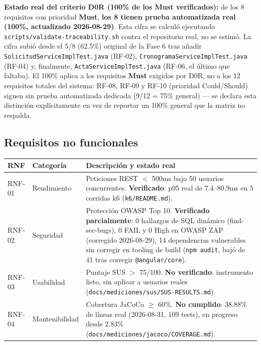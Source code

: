 \documentclass[11pt,a4paper]{article}
\begin{document}
\textbf{Estado real del criterio D0R (100\% de los Must verificados):} de los 8 requisitos con
prioridad \textbf{Must}, \textbf{los 8 tienen prueba automatizada real (100\%, actualizado 2026-08-29)}.
Esta cifra se calculó ejecutando \texttt{scripts/validate-traceability.sh} contra el repositorio real, no
se estimó. La cifra subió desde el 5/8 (62.5\%) original de la Fase 6 tras añadir
\texttt{SolicitudServiceImplTest.java} (RF-02), \texttt{CronogramaServiceImplTest.java} (RF-04) y,
finalmente, \texttt{ActaServiceImplTest.java} (RF-06, el último que faltaba). El 100\% aplica a los
requisitos \textbf{Must} exigidos por D0R, no a los 12 requisitos totales del sistema: RF-08, RF-09 y
RF-10 (prioridad Could/Should) siguen sin prueba automatizada dedicada (9/12 = 75\% general) --- se
declara esta distinción explícitamente en vez de reportar un 100\% general que la matriz no respalda.

\subsection{Requisitos no funcionales}

\begin{table}[H]
\centering
\begin{tabular}{ll p{8cm}}
\toprule
\textbf{RNF} & \textbf{Categoría} & \textbf{Descripción y estado real} \\
\midrule
RNF-01 & Rendimiento & Peticiones REST $<$ 500ms bajo 50 usuarios concurrentes. \textbf{Verificado}: p95 real de 7.4--80.9ms en 5 corridas k6 (\texttt{k6/README.md}). \\
RNF-02 & Seguridad & Protección OWASP Top 10. \textbf{Verificado parcialmente}: 0 hallazgos de SQL dinámico (find-sec-bugs), 0 FAIL y 0 High en OWASP ZAP (corregido 2026-08-29), 14 dependencias vulnerables sin corregir en tooling de build (\texttt{npm audit}, bajó de 41 tras corregir \texttt{@angular/core}). \\
RNF-03 & Usabilidad & Puntaje SUS $>$ 75/100. \textbf{No verificado}: instrumento listo, sin aplicar a usuarios reales (\texttt{docs/mediciones/sus/SUS-RESULTS.md}). \\
RNF-04 & Mantenibilidad & Cobertura JaCoCo $\geq$ 60\%. \textbf{No cumplido}: 38.88\% de líneas real (2026-08-31, 109 tests), en progreso desde 2.83\% (\texttt{docs/mediciones/jacoco/COVERAGE.md}). \\
\bottomrule
\end{tabular}
\end{table}
\end{document}
